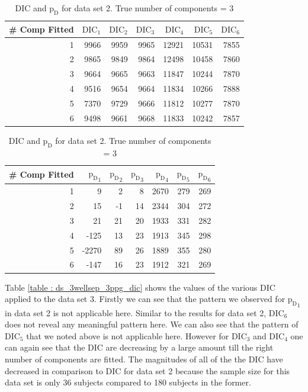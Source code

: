 \begin{table}[!htb]
\centering
\caption{DIC and $\text{p}_\text{D}$ for data set 2. True number of components = 3}
\label{table : ds_3wellsep_dic} 
\begin{tabular}{@{}rrrrrrr@{}}
\toprule
\# Comp Fitted & $\text{DIC}_1$ & $\text{DIC}_2$  & $\text{DIC}_3$  & $\text{DIC}_4$  & $\text{DIC}_5$  & $\text{DIC}_6$  \\ \midrule
1 & 9966 & 9959 & 9965 & 12921 & 10531 & 7855 \\
2 & 9865 & 9849 & 9864 & 12498 & 10458 & 7860 \\
3 & 9664 & 9665 & 9663 & 11847 & 10244 & 7870 \\
4 & 9516 & 9654 & 9664 & 11834 & 10266 & 7888 \\
5 & 7370 & 9729 & 9666 & 11812 & 10277 & 7870 \\
6 & 9498 & 9661 & 9668 & 11833 & 10242 & 7857 \\ \bottomrule
\end{tabular}

\begin{tabular}{@{}rrrrrrr@{}}
\toprule
\# Comp Fitted & ${\text{p}_\text{D}}_1$ & ${\text{p}_\text{D}}_2$ & ${\text{p}_\text{D}}_3$ & ${\text{p}_\text{D}}_4$ & ${\text{p}_\text{D}}_5$ & ${\text{p}_\text{D}}_6$ \\ \midrule
1 & 9 & 2 & 8 & 2670 & 279 & 269 \\
2 & 15 & -1 & 14 & 2344 & 304 & 272 \\
3 & 21 & 21 & 20 & 1933 & 331 & 282 \\
4 & -125 & 13 & 23 & 1913 & 345 & 298 \\
5 & -2270 & 89 & 26 & 1889 & 355 & 280 \\
6 & -147 & 16 & 23 & 1912 & 321 & 269 \\ \bottomrule
\end{tabular}
\end{table}

Table \ref{table : ds_3wellsep_3ppg_dic} shows the values of the various DIC applied to the data set 3. Firstly we can see that the pattern we observed for ${\text{p}_\text{D}}_1$ in data set 2 is not applicable here. Similar to the results for data set 2, $\text{DIC}_6$ does not reveal any meaningful pattern here. We can also see that the pattern of $\text{DIC}_5$ that we noted above is not applicable here. However for $\text{DIC}_3$ and $\text{DIC}_4$ one can again see that the DIC are decreasing by a large amount till the right number of components are fitted. The magnitudes of all of the the DIC have decreased in comparison to DIC for data set 2 because the sample size for this data set is only 36 subjects compared to 180 subjects in the former.

